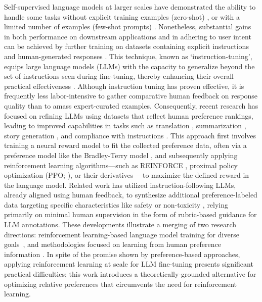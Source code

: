 Self-supervised language models at larger scales have demonstrated the ability to handle some tasks without explicit training examples (zero-shot) \citep{radford2019language}, or with a limited number of examples (few-shot prompts) \citep{gpt3,megatron,chowdhery2022palm}. Nonetheless, substantial gains in both performance on downstream applications and in adhering to user intent can be achieved by further training on datasets containing explicit instructions and human-generated responses \citep{mishra-etal-2022-cross,sanh2022multitask,chung2022scaling,thoppilan2022lamda}. This technique, known as `instruction-tuning', equips large language models (LLMs) with the capacity to generalize beyond the set of instructions seen during fine-tuning, thereby enhancing their overall practical effectiveness \citep{chung2022scaling}. Although instruction tuning has proven effective, it is frequently less labor-intensive to gather comparative human feedback on response quality than to amass expert-curated examples. Consequently, recent research has focused on refining LLMs using datasets that reflect human preference rankings, leading to improved capabilities in tasks such as translation \citep{kreutzer-etal-2018-reliability}, summarization \citep{stiennon2022learning,ziegler2020finetuning}, story generation \citep{ziegler2020finetuning}, and compliance with instructions \citep{ouyang2022training,ramamurthy2023is}. This approach first involves training a neural reward model to fit the collected preference data, often via a preference model like the Bradley-Terry model \citep{bradley1952rankanalysis}, and subsequently applying reinforcement learning algorithms—such as REINFORCE \citep{williams1992reinforce}, proximal policy optimization (PPO; \cite{schulman2017proximal}), or their derivatives \citep{ramamurthy2023is}—to maximize the defined reward in the language model. Related work has utilized instruction-following LLMs, already aligned using human feedback, to synthesize additional preference-labeled data targeting specific characteristics like safety or non-toxicity \citep{bai2022constitutional}, relying primarily on minimal human supervision in the form of rubric-based guidance for LLM annotations. These developments illustrate a merging of two research directions: reinforcement learning-based language model training for diverse goals~\citep{Ranzato2015SequenceLT,paulus2018a,wu2018learning}, and methodologies focused on learning from human preference information \citep{christiano2017deep,kupcsik2018learning}. In spite of the promise shown by preference-based approaches, applying reinforcement learning at scale for LLM fine-tuning presents significant practical difficulties; this work introduces a theoretically-grounded alternative for optimizing relative preferences that circumvents the need for reinforcement learning.

